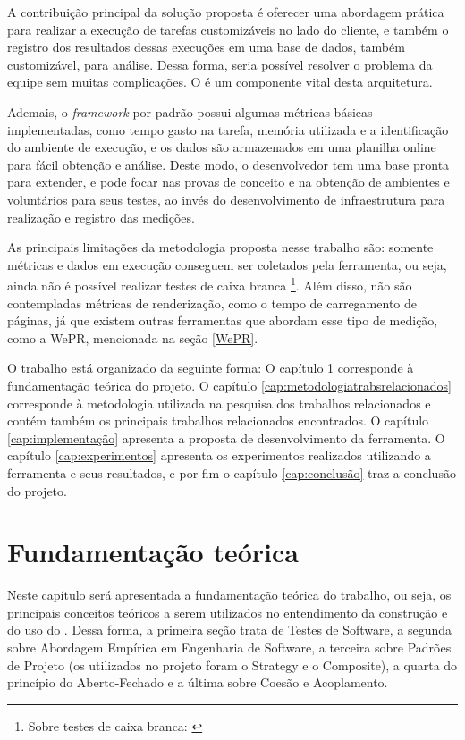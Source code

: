 \documentclass[12pt]{tcc}
\begin{document}
A contribuição principal da solução proposta é oferecer uma abordagem prática para realizar a execução de tarefas customizáveis no lado do cliente, e também o registro dos resultados dessas execuções em uma base de dados, também customizável, para análise. Dessa forma, seria possível resolver o problema da equipe sem muitas complicações. O  é um componente vital desta arquitetura.

Ademais, o \emph{framework} por padrão possui algumas métricas básicas implementadas, como tempo gasto na tarefa, memória utilizada e a identificação do ambiente de execução, e os dados são armazenados em uma planilha online para fácil obtenção e análise. Deste modo, o desenvolvedor tem uma base pronta para extender, e pode focar nas provas de conceito e na obtenção de ambientes e voluntários para seus testes, ao invés do desenvolvimento de infraestrutura para realização e registro das medições.

As principais limitações da metodologia proposta nesse trabalho são: somente métricas e dados em execução conseguem ser coletados pela ferramenta, ou seja, ainda não é possível realizar testes de caixa branca \footnote{Sobre testes de caixa branca: \citep[Capítulo 21]{Sommerville2015Software}}. Além disso, não são contempladas métricas de renderização, como o tempo de carregamento de páginas, já que existem outras ferramentas que abordam esse tipo de medição, como a WePR, mencionada na seção \ref{WePR}.

O trabalho está organizado da seguinte forma: O capítulo \ref{cap:fundamentacao_teorica} corresponde à fundamentação teórica do projeto. O capítulo \ref{cap:metodologiatrabsrelacionados} corresponde à metodologia utilizada na pesquisa dos trabalhos relacionados e contém também os principais trabalhos relacionados encontrados.
O capítulo \ref{cap:implementação} apresenta a proposta de desenvolvimento da ferramenta. O capítulo \ref{cap:experimentos} apresenta os experimentos realizados utilizando a ferramenta e seus resultados, e por fim o capítulo \ref{cap:conclusão} traz a conclusão do projeto.


\chapter{Fundamentação teórica}
\label{cap:fundamentacao_teorica}

	Neste capítulo será apresentada a fundamentação teórica do trabalho, ou seja, os principais conceitos teóricos a serem utilizados no entendimento da construção e do uso do . Dessa forma, a primeira seção trata de Testes de Software, a segunda sobre Abordagem Empírica em Engenharia de Software, a terceira sobre Padrões de Projeto (os utilizados no projeto foram o Strategy e o Composite), a quarta do princípio do Aberto-Fechado e a última sobre Coesão e Acoplamento.
\end{document}

